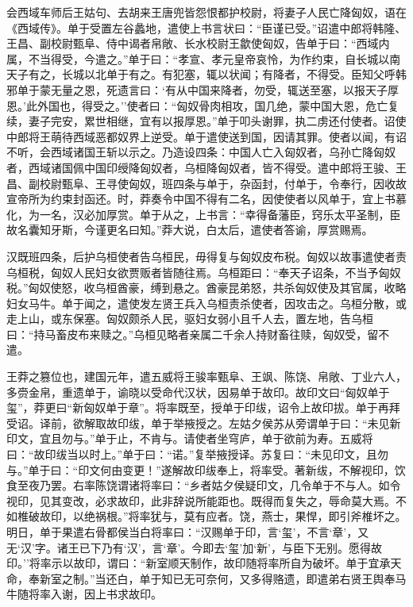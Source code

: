 \documentclass[]{article}
\begin{document}
会西域车师后王姑句、去胡来王唐兜皆怨恨都护校尉，将妻子人民亡降匈奴，语在《西域传》。单于受置左谷蠡地，遣使上书言状曰：``臣谨已受。''诏遣中郎将韩隆、王昌、副校尉甄阜、侍中谒者帛敞、长水校尉王歙使匈奴，告单于曰：``西域内属，不当得受，今遣之。''单于曰：``孝宣、孝元皇帝哀怜，为作约束，自长城以南天子有之，长城以北单于有之。有犯塞，辄以状闻；有降者，不得受。臣知父呼韩邪单于蒙无量之恩，死遗言曰：`有从中国来降者，勿受，辄送至塞，以报天子厚恩。'此外国也，得受之。''使者曰：``匈奴骨肉相攻，国几绝，蒙中国大恩，危亡复续，妻子完安，累世相继，宜有以报厚恩。''单于叩头谢罪，执二虏还付使者。诏使中郎将王萌待西域恶都奴界上逆受。单于遣使送到国，因请其罪。使者以闻，有诏不听，会西域诸国王斩以示之。乃造设四条：中国人亡入匈奴者，乌孙亡降匈奴者，西域诸国佩中国印绶降匈奴者，乌桓降匈奴者，皆不得受。遣中郎将王骏、王昌、副校尉甄阜、王寻使匈奴，班四条与单于，杂函封，付单于，令奉行，因收故宣帝所为约束封函还。时，莽奏令中国不得有二名，因使使者以风单于，宜上书慕化，为一名，汉必加厚赏。单于从之，上书言：``幸得备藩臣，窍乐太平圣制，臣故名囊知牙斯，今谨更名曰知。''莽大说，白太后，遣使者答谕，厚赏赐焉。

汉既班四条，后护乌桓使者告乌桓民，毋得复与匈奴皮布税。匈奴以故事遣使者责乌桓税，匈奴人民妇女欲贾贩者皆随往焉。乌桓距曰：``奉天子诏条，不当予匈奴税。''匈奴使怒，收乌桓酋豪，缚到悬之。酋豪昆弟怒，共杀匈奴使及其官属，收略妇女马牛。单于闻之，遣使发左贤王兵入乌桓责杀使者，因攻击之。乌桓分散，或走上山，或东保塞。匈奴颇杀人民，驱妇女弱小且千人去，置左地，告乌桓曰：``持马畜皮布来赎之。''乌桓见略者亲属二千余人持财畜往赎，匈奴受，留不遣。

王莽之篡位也，建国元年，遣五威将王骏率甄阜、王飒、陈饶、帛敞、丁业六人，多赍金帛，重遗单于，谕晓以受命代汉状，因易单于故印。故印文曰``匈奴单于玺''，莽更曰``新匈奴单于章''。将率既至，授单于印绂，诏令上故印拔。单于再拜受诏。译前，欲解取故印绂，单于举掖授之。左姑夕侯苏从旁谓单于曰：``未见新印文，宜且勿与。''单于止，不肯与。请使者坐穹庐，单于欲前为寿。五威将曰：``故印绂当以时上。''单于曰：``诺。''复举掖授译。苏复曰：``未见印文，且勿与。''单于曰：``印文何由变更！''遂解故印绂奉上，将率受。著新绂，不解视印，饮食至夜乃罢。右率陈饶谓诸将率曰：``乡者姑夕侯疑印文，几令单于不与人。如令视印，见其变改，必求故印，此非辞说所能距也。既得而复失之，辱命莫大焉。不如椎破故印，以绝祸根。''将率犹与，莫有应者。饶，燕士，果悍，即引斧椎坏之。明日，单于果遣右骨都侯当白将率曰：``汉赐单于印，言`玺'，不言`章'，又无`汉'字。诸王已下乃有`汉'，言`章'。今即去`玺'加`新'，与臣下无别。愿得故印。''将率示以故印，谓曰：``新室顺天制作，故印随将率所自为破坏。单于宜承天命，奉新室之制。''当还白，单于知已无可奈何，又多得赂遗，即遣弟右贤王舆奉马牛随将率入谢，因上书求故印。
\end{document}
